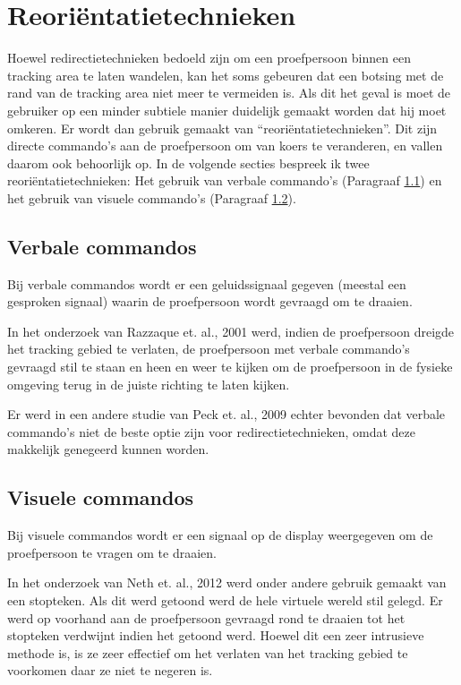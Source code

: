 \section{Reori\"entatietechnieken} \label{1:rot}
Hoewel redirectietechnieken bedoeld zijn om een proefpersoon binnen een tracking
area te laten wandelen, kan het soms gebeuren dat een botsing met de rand van de
tracking area niet meer te vermeiden is. Als dit het geval is moet de gebruiker
op een minder subtiele manier duidelijk gemaakt worden dat hij moet omkeren. Er 
wordt dan gebruik gemaakt van ``reori\"entatietechnieken''. Dit zijn directe 
commando's aan de proefpersoon om van koers te veranderen, en vallen daarom ook 
behoorlijk op. In de volgende secties bespreek ik twee reori\"entatietechnieken:
Het gebruik van verbale commando's (Paragraaf \ref{1:verbal}) en het gebruik van
visuele commando's (Paragraaf \ref{1:visual}).



\subsection{Verbale commandos} \label{1:verbal}
Bij verbale commandos wordt er een geluidssignaal gegeven (meestal een gesproken
signaal) waarin de proefpersoon wordt gevraagd om te draaien.

In het onderzoek van Razzaque et. al., 2001 \cite{kohn01} werd, indien de
proefpersoon dreigde het tracking gebied te verlaten, de proefpersoon met verbale
commando's gevraagd stil te staan en heen en weer te kijken om de proefpersoon in
de fysieke omgeving terug in de juiste richting te laten kijken.

Er werd in een andere studie van Peck et. al., 2009 \cite{peck09} echter bevonden 
dat verbale commando's niet de beste optie zijn voor redirectietechnieken, omdat
deze makkelijk genegeerd kunnen worden.


\subsection{Visuele commandos} \label{1:visual}
Bij visuele commandos wordt er een signaal op de display weergegeven om de 
proefpersoon te vragen om te draaien.

In het onderzoek van Neth et. al., 2012 \cite{neth12} werd onder andere gebruik 
gemaakt van een stopteken. Als dit werd getoond werd de hele virtuele wereld stil 
gelegd. Er werd op voorhand aan de proefpersoon gevraagd rond te draaien tot het 
stopteken verdwijnt indien het getoond werd. Hoewel dit een zeer intrusieve 
methode is, is ze zeer effectief om het verlaten van het tracking gebied te 
voorkomen daar ze niet te negeren is.


